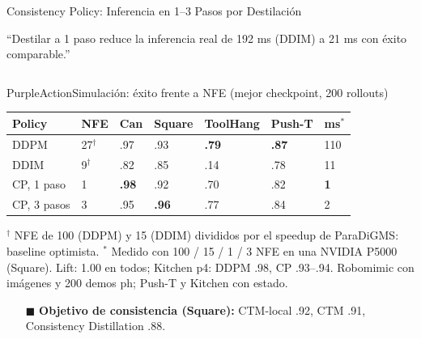 \documentclass[aspectratio=169,10pt,xcolor={dvipsnames,table}]{beamer}
\newcommand{\BannerFont}{\fontsize{7.5}{9.2}\selectfont\bfseries}       %
\newcommand{\BannerArc}{1.5pt}             %
\newcommand{\BannerRule}{0.5pt}            %
\newcommand{\BannerLeftRule}{2.5pt}        %
\newcommand{\CardHeightTall}{46mm}         %
\newcommand{\BannerCentral}[2][UCNCyan]{%
  \begin{tcolorbox}[
    enhanced,
    colback=#1!10,
    colframe=#1,
    boxrule=\BannerRule,
    leftrule=\BannerLeftRule,
    arc=\BannerArc,
    top=0.35mm, bottom=0.35mm, left=2mm, right=2mm
  ]
    {\BannerFont\raggedright\textcolor{UCNBlue}{#2}\par}
  \end{tcolorbox}%
  \vspace{-2.5mm}%
}
\newcommand{\BannerRef}[1]{{\mdseries\fontsize{5}{6}\selectfont\textcolor{TextDark!65}{\cite{#1}}}} %
\newcommand{\TabFont}{\fontsize{5.3}{6.4}\selectfont}                    %
\begin{document}
\begin{frame}{Consistency Policy: Inferencia en 1--3 Pasos por Destilación}
  \BannerCentral[PurpleAction]{``Destilar a 1 paso reduce la inferencia real de 192 ms (DDIM) a 21 ms con éxito comparable.'' \BannerRef{prasad2024consistency}}
  \vspace{0.8mm}
  \begin{columns}[T, onlytextwidth]
    \begin{column}{0.56\textwidth}
      \begin{Card}[height=\CardHeightTall]{PurpleAction}{Simulación: éxito frente a NFE (mejor checkpoint, 200 rollouts)}
        {\TabFont
        \setlength{\tabcolsep}{1.4pt}
        \renewcommand{\arraystretch}{1.1}
        \begin{tabular}{@{}L{14mm} C{9mm} *{4}{C{10mm}} C{10mm}@{}}
          \toprule
          \textbf{Policy} & \textbf{NFE} & \textbf{Can} & \textbf{Square} & \textbf{ToolHang} & \textbf{Push-T} & \textbf{ms}$^{\ast}$ \\
          \midrule
          DDPM & 27$^{\dagger}$ & .97 & .93 & \textbf{.79} & \textbf{.87} & 110 \\
          DDIM & 9$^{\dagger}$ & .82 & .85 & .14 & .78 & 11 \\
           CP, 1 paso & 1 & \textbf{.98} & .92 & .70 & .82 & \textbf{1} \\
           CP, 3 pasos & 3 & .95 & \textbf{.96} & .77 & .84 & 2 \\
          \bottomrule
        \end{tabular}\par
        \vspace{0.8mm}
        \textcolor{TextDark!80}{$^{\dagger}$ NFE de 100 (DDPM) y 15 (DDIM) divididos por el speedup de ParaDiGMS: baseline optimista. $^{\ast}$ Medido con 100 / 15 / 1 / 3 NFE en una NVIDIA P5000 (Square). Lift: 1.00 en todos; Kitchen p4: DDPM .98, CP .93--.94. Robomimic con imágenes y 200 demos ph; Push-T y Kitchen con estado.}\par
        \vspace{0.8mm}
        \begin{itemize}\setlength{\itemsep}{0.6pt}
          \item[\textcolor{PurpleAction}{$\blacksquare$}] \textbf{Objetivo de consistencia (Square):} CTM-local .92, CTM .91, Consistency Distillation .88.

\end{itemize}}
\end{Card}
\end{column}
\end{columns}
\end{frame}
\end{document}
